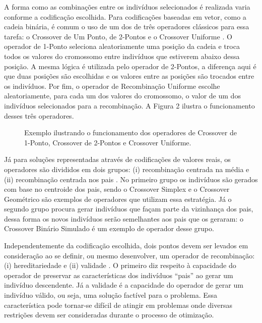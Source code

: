A forma como as combinações entre os indivíduos selecionados é realizada varia conforme a codificação escolhida. Para codificações baseadas em vetor, como a cadeia binária, é comum o uso de um dos de três operadores clássicos para essa tarefa: o Crossover de Um Ponto, de 2-Pontos e o Crossover Uniforme \cite{Talbi2009}. O operador de 1-Ponto seleciona aleatoriamente uma posição da cadeia e troca todos os valores do cromossomo entre indivíduos que estiverem abaixo dessa posição.  A mesma lógica é utilizada pelo operador de 2-Pontos, a diferença aqui é que duas posições são escolhidas e os valores entre as posições são trocados entre os indivíduos. Por fim, o operador de Recombinação Uniforme escolhe aleatoriamente, para cada um dos valores do cromossomo, o valor de um dos indivíduos selecionados para a recombinação. A Figura 2 ilustra o funcionamento desses três operadores.

\begin{figure}[htb]
\centering

\caption{Exemplo ilustrando o funcionamento dos operadores de Crossover de 1-Ponto, Crossover de 2-Pontos e Crossover Uniforme.}

\end{figure}

Já para soluções representadas através de codificações de valores reais, os operadores são divididos em dois grupos: (i) recombinação centrada na média e (ii) recombinação centrada nos pais \cite{Talbi2009}. No primeiro grupo os indivíduos são gerados com base no centroide dos pais, sendo o Crossover Simplex \cite{Tsutsui1999} e o Crossover Geométrico \cite{Michalewicz1996} são exemplos de operadores que utilizam essa estratégia. Já o segundo grupo procura gerar indivíduos que façam parte da vizinhança dos pais, dessa forma os novos indivíduos serão semelhantes aos pais que os geraram: o Crossover Binário Simulado \cite{Deb1994} é um exemplo de operador desse grupo.   

Independentemente da codificação escolhida, dois pontos devem ser levados em consideração ao se definir, ou mesmo desenvolver, um operador de recombinação: (i) hereditariedade e (ii) validade \cite{Talbi2009}. O primeiro diz respeito à capacidade do operador de preservar as características dos indivíduos “pais” ao gerar um indivíduo descendente. Já a validade é a capacidade do operador de gerar um indivíduo válido, ou seja, uma solução factível para o problema. Essa característica pode tornar-se difícil de atingir em problemas onde diversas restrições devem ser consideradas durante o processo de otimização.

